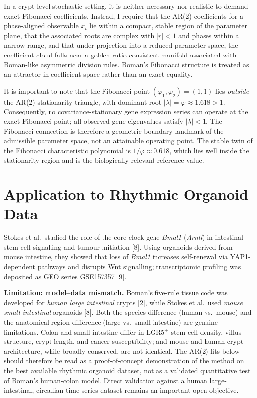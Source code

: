 \documentclass[]{interact}
\begin{document}
In a crypt-level stochastic setting, it is neither necessary nor realistic to
demand exact Fibonacci coefficients.
Instead, I require that the AR(2) coefficients for a phase-aligned observable
$x_t$ lie within a compact, stable region of the parameter plane, that the
associated roots are complex with $|r| < 1$ and phases within a narrow range,
and that under projection into a reduced parameter space, the coefficient cloud
falls near a golden-ratio-consistent manifold associated with Boman-like
asymmetric division rules.
Boman's Fibonacci structure is treated as an attractor in coefficient space
rather than an exact equality.

It is important to note that the Fibonacci point $(\varphi_1,\varphi_2)=(1,1)$
lies \emph{outside} the AR(2) stationarity triangle, with dominant root
$|\lambda| = \varphi \approx 1.618 > 1$.
Consequently, no covariance-stationary gene expression series can operate at
the exact Fibonacci point; all observed gene eigenvalues satisfy $|\lambda|<1$.
The Fibonacci connection is therefore a geometric boundary landmark of the
admissible parameter space, not an attainable operating point.
The stable twin of the Fibonacci characteristic polynomial is $1/\varphi
\approx 0.618$, which lies well inside the stationarity region and is the
biologically relevant reference value.

\section{Application to Rhythmic Organoid Data}

Stokes et al.\ studied the role of the core clock gene \textit{Bmal1}
(\textit{Arntl}) in intestinal stem cell signalling and tumour initiation [8].
Using organoids derived from mouse intestine, they showed that loss of
\textit{Bmal1} increases self-renewal via YAP1-dependent pathways and disrupts
Wnt signalling; transcriptomic profiling was deposited as GEO series
GSE157357 [9].

\textbf{Limitation: model--data mismatch.}
Boman's five-rule tissue code was developed for \emph{human large intestinal}
crypts [2], while Stokes et al.\ used \emph{mouse small intestinal}
organoids [8].
Both the species difference (human vs.\ mouse) and the anatomical region
difference (large vs.\ small intestine) are genuine limitations.
Colon and small intestine differ in LGR5$^{+}$ stem cell density, villus
structure, crypt length, and cancer susceptibility; and mouse and human crypt
architecture, while broadly conserved, are not identical.
The AR(2) fits below should therefore be read as a proof-of-concept
demonstration of the method on the best available rhythmic organoid dataset,
not as a validated quantitative test of Boman's human-colon model.
Direct validation against a human large-intestinal, circadian time-series
dataset remains an important open objective.
\end{document}
